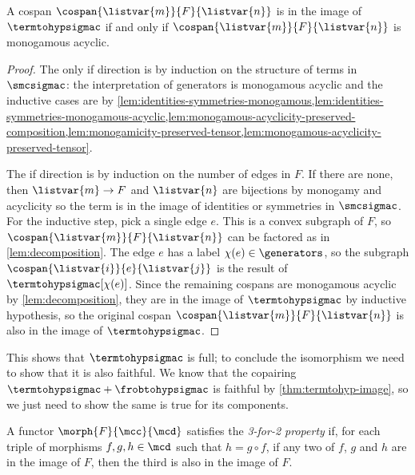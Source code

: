 \begin{theorem}\label{thm:monogamous-acyclic-full}
    A cospan \(\cospan{\listvar{m}}{F}{\listvar{n}}\) is in the image of
    \(\termtohypsigmac\) if and only if \(\cospan{\listvar{m}}{F}{\listvar{n}}\)
    is monogamous acyclic.
\end{theorem}
\begin{proof}
    The only if direction is by induction on the structure of terms in
    \(\smcsigmac\): the interpretation of generators is monogamous acyclic and
    the inductive cases are by
    \cref{lem:identities-symmetries-monogamous,lem:identities-symmetries-monogamous-acyclic,lem:monogamous-acyclicity-preserved-composition,lem:monogamicity-preserved-tensor,lem:monogamous-acyclicity-preserved-tensor}.

    The if direction is by induction on the number of edges in \(F\).
    If there are none, then \(\listvar{m} \to F\) and \(\listvar{n}\) are
    bijections by monogamy and acyclicity so the term is in the image of
    identities or symmetries in \(\smcsigmac\).
    For the inductive step, pick a single edge \(e\).
    This is a convex subgraph of \(F\), so
    \(\cospan{\listvar{m}}{F}{\listvar{n}}\) can be factored as in
    \cref{lem:decomposition}.
    The edge \(e\) has a label \(\chi(e) \in \generators\), so the subgraph
    \(\cospan{\listvar{i}}{e}{\listvar{j}}\) is the result of
    \(\termtohypsigmac[\chi(e)]\).
    Since the remaining cospans are monogamous acyclic by
    \cref{lem:decomposition}, they are in the image of \(\termtohypsigmac\) by
    inductive hypothesis, so the original cospan
    \(\cospan{\listvar{m}}{F}{\listvar{n}}\) is also in the image of
    \(\termtohypsigmac\).
\end{proof}

This shows that \(\termtohypsigmac\) is full; to conclude the isomorphism we
need to show that it is also faithful.
We know that the copairing \(\termtohypsigmac + \frobtohypsigmac\) is faithful
by \cref{thm:termtohyp-image}, so we just need to show the same is true for its
components.

\begin{definition}
    A functor \(\morph{F}{\mcc}{\mcd}\) satisfies the \emph{3-for-2 property}
    if, for each triple of morphisms \(f,g,h \in \mcd\) such that
    \(h = g \circ f\), if any two of \(f\), \(g\) and \(h\) are in the image of
    \(F\), then the third is also in the image of \(F\).
\end{definition}

